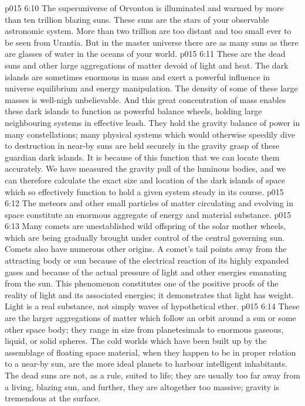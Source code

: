 \vs p015 6:10 The superuniverse of Orvonton is illuminated and warmed by more than ten trillion blazing suns. These suns are the stars of your observable astronomic system. More than two trillion are too distant and too small ever to be seen from Urantia. But in the master universe there are as many suns as there are glasses of water in the oceans of your world.
\vs p015 6:11 \pc {} These are the dead suns and other large aggregations of matter devoid of light and heat. The dark islands are sometimes enormous in mass and exert a powerful influence in universe equilibrium and energy manipulation. The density of some of these large masses is well\hyp{}nigh unbelievable. And this great concentration of mass enables these dark islands to function as powerful balance wheels, holding large neighbouring systems in effective leash. They hold the gravity balance of power in many constellations; many physical systems which would otherwise speedily dive to destruction in near\hyp{}by suns are held securely in the gravity grasp of these guardian dark islands. It is because of this function that we can locate them accurately. We have measured the gravity pull of the luminous bodies, and we can therefore calculate the exact size and location of the dark islands of space which so effectively function to hold a given system steady in its course.
\vs p015 6:12 \pc {} The meteors and other small particles of matter circulating and evolving in space constitute an enormous aggregate of energy and material substance.
\vs p015 6:13 Many comets are unestablished wild offspring of the solar mother wheels, which are being gradually brought under control of the central governing sun. Comets also have numerous other origins. A comet’s tail points away from the attracting body or sun because of the electrical reaction of its highly expanded gases and because of the actual pressure of light and other energies emanating from the sun. This phenomenon constitutes one of the positive proofs of the reality of light and its associated energies; it demonstrates that light has weight. Light is a real substance, not simply waves of hypothetical ether.
\vs p015 6:14 \pc {} These are the larger aggregations of matter which follow an orbit around a sun or some other space body; they range in size from planetesimals to enormous gaseous, liquid, or solid spheres. The cold worlds which have been built up by the assemblage of floating space material, when they happen to be in proper relation to a near\hyp{}by sun, are the more ideal planets to harbour intelligent inhabitants. The dead suns are not, as a rule, suited to life; they are usually too far away from a living, blazing sun, and further, they are altogether too massive; gravity is tremendous at the surface.
